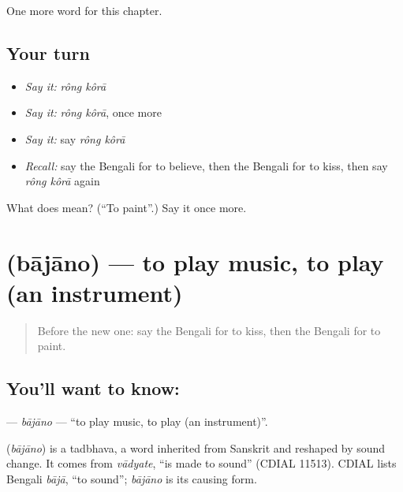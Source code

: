 \begin{grammarlens}[title={What you've built}]
One more word for this chapter.
\end{grammarlens}

\subsection*{Your turn}
\begin{itemize}
\raggedright
  \item \emph{Say it:} \emph{rông kôrā}
  \item \emph{Say it:} \emph{rông kôrā}, once more
  \item \emph{Say it:} say \emph{rông kôrā}
  \item \emph{Recall:} say the Bengali for to believe, then the Bengali for to kiss, then say \emph{rông kôrā} again
\end{itemize}

\begin{tcolorbox}[breakable,colback=teal!4,colframe=teal!35!black,title={Before you move on}]
What does   mean? (\textquotedblleft{}To paint\textquotedblright{}.) Say it once more.
\end{tcolorbox}
\section[\texorpdfstring{\bn{বাজানো} (bājāno)}{বাজানো (bājāno)}]{ (bājāno) — to play music, to play (an instrument)}

\label{lesson:BN-C239-bajano}



\begin{quote}
Before the new one: say the Bengali for to kiss, then the Bengali for to paint.
\end{quote}

\subsection*{You'll want to know: }
\textbf{} — \emph{bājāno} — \textquotedblleft{}to play music, to play (an instrument)\textquotedblright{}.

\begin{cousinweb}
\textbf{} (\emph{bājāno}) is a tadbhava, a word inherited from Sanskrit and reshaped by sound change. It comes from \emph{vādyate}, \textquotedblleft{}is made to sound\textquotedblright{} (CDIAL 11513). CDIAL lists Bengali \emph{bājā}, \textquotedblleft{}to sound\textquotedblright{}; \emph{bājāno} is its causing form.
\end{cousinweb}

